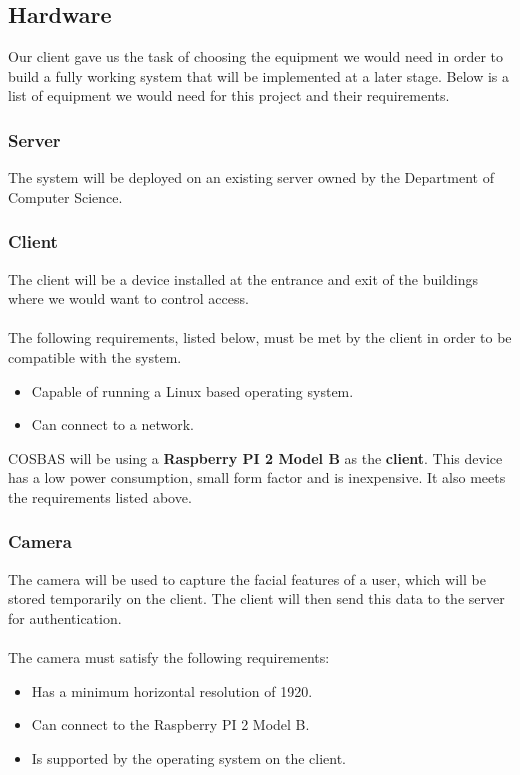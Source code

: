 \subsection{Hardware}
Our client gave us the task of choosing the equipment we would need in order to build a fully working system that will be implemented at a later stage. Below is a list of equipment we would need for this project and their requirements.

	\subsubsection{Server}
	The system will be deployed on an existing server owned by the Department of Computer Science.
	
	\subsubsection{Client}
	The client will be a device installed at the entrance and exit of the buildings where we would want to control access.\\
\\
 The following requirements, listed below, must be met by the client in order to be compatible with the system.
	\begin{itemize}
		\item Capable of running a Linux based operating system.
		\item Can connect to a network.
	\end{itemize}
	
COSBAS will be using a \textbf{Raspberry PI 2 Model B} as the \textbf{client}. This device has a low power consumption, small form factor and is inexpensive. It also meets the requirements listed above. 

	\subsubsection{Camera}
	The camera will be used to capture the facial features of a user, which will be stored temporarily on the client. The client will then send this data to the server for authentication.\\
\\
The camera must satisfy the following requirements:
	\begin{itemize}
		\item Has a minimum horizontal resolution of 1920. %
		\item Can connect to the Raspberry PI 2 Model B.
		\item Is supported by the operating system on the client.
	\end{itemize}

